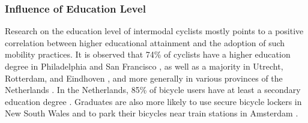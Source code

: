 \begin{refsegment}
\subsubsection*{Influence of Education Level
    \label{chap2:education}
}

Research on the education level of intermodal cyclists mostly points to a positive correlation between higher educational attainment and the adoption of such mobility practices. It is observed that 74\% of cyclists have a higher education degree in Philadelphia and San Francisco \textcolor{blue}{\autocite[103]{flamm_public_2014}}, as well as a majority in Utrecht, Rotterdam, and Eindhoven \textcolor{blue}{\autocite[11]{jonkeren_bicycle-train_2021}}, and more generally in various provinces of the Netherlands \textcolor{blue}{\autocite[113]{heinen_multimodal_2014}}. In the Netherlands, 85\% of bicycle users have at least a secondary education degree \textcolor{blue}{\autocite[15]{shelat_analysing_2018}}. Graduates are also more likely to use secure bicycle lockers in New South Wales \textcolor{blue}{\autocite[18]{arbis_analysis_2016}}
 and to park their bicycles near train stations in Amsterdam \textcolor{blue}{\autocite[344]{kampen_bicycle_2021}}.%


\end{refsegment}
